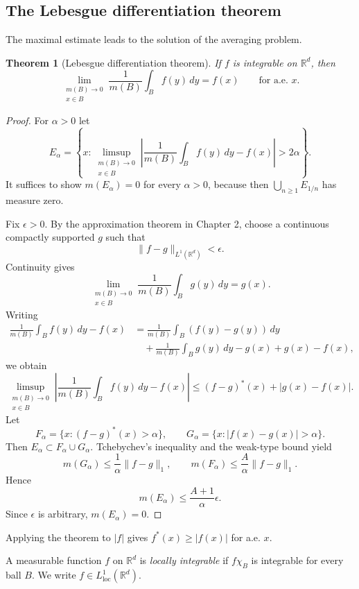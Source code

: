 \documentclass[11pt,openany]{book}
\newtheorem{theorem}{Theorem}[section]
\begin{document}
\subsection{The Lebesgue differentiation theorem}

The maximal estimate leads to the solution of the averaging problem.

\begin{theorem}[Lebesgue differentiation theorem]
If $f$ is integrable on $\mathbb R^d$, then
\begin{equation}
\lim_{\substack{m(B)\to0\\x\in B}}
\frac1{m(B)}\int_B f(y)\,dy=f(x)
\qquad\text{for a.e. }x.
\tag{4}
\end{equation}
\end{theorem}

\begin{proof}
For $\alpha>0$ let
\[
E_\alpha=
\left\{x:\limsup_{\substack{m(B)\to0\\x\in B}}
\left|\frac1{m(B)}\int_Bf(y)\,dy-f(x)\right|>2\alpha\right\}.
\]
It suffices to show $m(E_\alpha)=0$ for every $\alpha>0$, because then $\bigcup_{n\ge1}E_{1/n}$ has measure zero.

Fix $\epsilon>0$. By the approximation theorem in Chapter 2, choose a continuous compactly supported $g$ such that
\[
\|f-g\|_{L^1(\mathbb R^d)}<\epsilon.
\]
Continuity gives
\[
\lim_{\substack{m(B)\to0\\x\in B}}\frac1{m(B)}\int_Bg(y)\,dy=g(x).
\]
Writing
\begin{align*}
\frac1{m(B)}\int_Bf(y)\,dy-f(x)
&=\frac1{m(B)}\int_B(f(y)-g(y))\,dy\\
&\quad+\frac1{m(B)}\int_Bg(y)\,dy-g(x)+g(x)-f(x),
\end{align*}
we obtain
\[
\limsup_{\substack{m(B)\to0\\x\in B}}
\left|\frac1{m(B)}\int_Bf(y)\,dy-f(x)\right|
\le (f-g)^*(x)+|g(x)-f(x)|.
\]
Let
\[
F_\alpha=\{x:(f-g)^*(x)>\alpha\},\qquad
G_\alpha=\{x:|f(x)-g(x)|>\alpha\}.
\]
Then $E_\alpha\subset F_\alpha\cup G_\alpha$. Tchebychev's inequality and the weak-type bound yield
\[
m(G_\alpha)\le\frac1\alpha\|f-g\|_1,
\qquad
m(F_\alpha)\le\frac A\alpha\|f-g\|_1.
\]
Hence
\[
m(E_\alpha)\le\frac{A+1}{\alpha}\epsilon.
\]
Since $\epsilon$ is arbitrary, $m(E_\alpha)=0$.
\end{proof}

Applying the theorem to $|f|$ gives $f^*(x)\ge|f(x)|$ for a.e. $x$.

A measurable function $f$ on $\mathbb R^d$ is \emph{locally integrable} if $f\chi_B$ is integrable for every ball $B$. We write $f\in L^1_{\mathrm{loc}}(\mathbb R^d)$.
\end{document}
